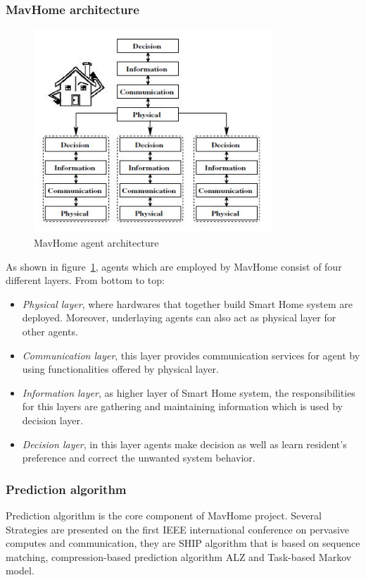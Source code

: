 \subsubsection{MavHome architecture}
 \begin{figure}[!htbp]
	\centering
	\includegraphics[width=0.8\textwidth]{smart-home-agent.jpg}
		\caption{MavHome agent architecture\cite{smart_home_agent}}
	\label{fig:smart-home-agent}

\end{figure}
As shown in figure~\ref{fig:smart-home-agent}, agents which are employed by MavHome consist of four different layers. From bottom to top:
\begin{itemize}
\item \emph{Physical layer}, where hardwares that together build Smart Home system are deployed. Moreover, underlaying agents can also act as physical layer for other agents.
\item \emph{Communication layer}, this layer provides communication services for agent by using functionalities offered by physical layer.
\item \emph{Information layer}, as higher layer of Smart Home system,  the responsibilities for this layers are gathering and maintaining information which is used by decision layer.
\item \emph{Decision layer}, in this layer agents make decision as well as learn resident's preference and correct the unwanted system behavior.
\end{itemize}
\subsubsection{Prediction algorithm}
Prediction algorithm is the core component of MavHome project. Several Strategies are presented on the first IEEE international conference on pervasive computes and communication, they are SHIP algorithm that is based on sequence matching, compression-based prediction algorithm ALZ and Task-based Markov model\cite{smart_home_agent}.

